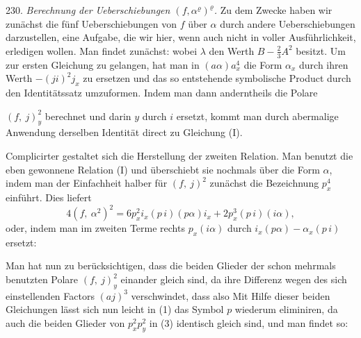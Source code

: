 230. \textit{Berechnung der Ueberschiebungen $(f, \alpha^{\varrho})^{\varrho}$.} Zu dem Zwecke
haben wir zunächst die fünf Ueberschiebungen von $f$ über $\alpha$ durch
andere Ueberschiebungen darzustellen, eine Aufgabe, die wir hier,
wenn auch nicht in voller Ausführlichkeit, erledigen wollen. Man
findet zunächst:
wobei $\lambda$ den Werth $B - \frac{2}{3}A^2$ besitzt. Um zur ersten Gleichung zu
gelangen, hat man in $(a\alpha)a_x^4$ die Form $\alpha_x$ durch ihren Werth
$-(ji)^2 j_x$ zu ersetzen und das so entstehende symbolische Product durch
den Identitätssatz umzuformen. Indem man dann anderntheils die Polare



$(f,\ j)_y^2$ berechnet und darin $y$ durch $i$ ersetzt, kommt man durch abermalige
Anwendung derselben Identität direct zu Gleichung (I).

Complicirter gestaltet sich die Herstellung der zweiten Relation.
Man benutzt die eben gewonnene Relation (I) und überschiebt sie
nochmals über die Form $\alpha$, indem man der Einfachheit halber für
$(f,\ j)^2$ zunächst die Bezeichnung $p_x^4$ einführt. Dies liefert
\[
4(f,\ \alpha^2)^2 = 6p_x^2 i_x (p\,i)(p\alpha) i_x + 2p_x^3(p\,i)(i\alpha),
\]
oder, indem man im zweiten Terme rechts $p_x(i\alpha)$ durch $i_x(p\alpha) - \alpha_x(p\,i)$
ersetzt:

Man hat nun zu berücksichtigen, dass die beiden Glieder der schon
mehrmals benutzten Polare $(f,\ j)_y^2$ einander gleich sind, da ihre Differenz
wegen des sich einstellenden Factors $(aj)^3$ verschwindet, dass also
Mit Hilfe dieser beiden Gleichungen lässt sich nun leicht in (1) das
Symbol $p$ wiederum eliminiren, da auch die beiden Glieder von $p_x^2 p_y^2$
in (3) identisch gleich sind, und man findet so:

